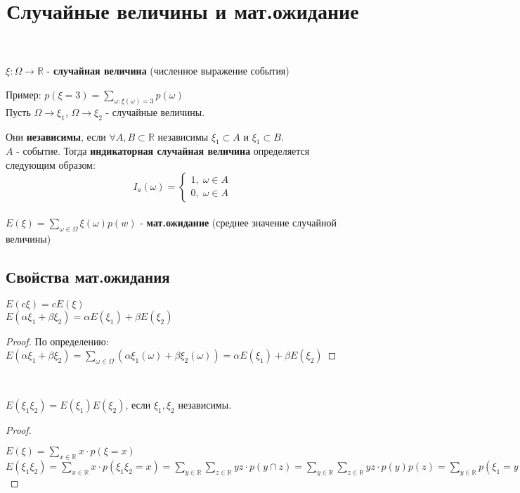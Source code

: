 \documentclass[a4paper,12pt]{article}
\title{Случайные величины и мат.ожидание}
\date{}
\begin{document}
	\maketitle
	\noindent $\xi:  \Omega \rightarrow \mathbb{R}$ - \textbf{случайная величина} (численное выражение события)

	\noindent Пример: $p(\xi=3)=\sum\limits_{\omega: \xi(\omega)=3} p(\omega)$\\

	\noindent Пусть  $\Omega \rightarrow \xi_1$, $\Omega \rightarrow \xi_2$ - случайные величины.

	\noindent Они \textbf{независимы}, если $\forall A, B \subset \mathbb{R}$ независимы $\xi_1 \subset A$ и $\xi_1 \subset B$.\\

	\noindent $A$ - событие. Тогда \textbf{индикаторная случайная величина} определяется следующим образом:
	\begin{equation*}
	I_a(\omega) =
	\begin{cases}
	1, \; \omega\in A\\
	0, \; \omega \in A
	\end{cases}
	\end{equation*}\\

	\noindent $E(\xi)=\sum\limits_{\omega \in \Omega} \xi(\omega)p(w)$ - \textbf{мат.ожидание} (среднее значение случайной величины) \\

	\subsection*{Свойства мат.ожидания}
	$E(c\xi)=cE(\xi)$\\


   	\noindent $E(\alpha\xi_1+\beta\xi_2)=\alpha E(\xi_1)+\beta E(\xi_2)$
	\begin{proof}
	По определению:
	$E(\alpha\xi_1+\beta\xi_2)=\sum\limits_{\omega \in \Omega}(\alpha\xi_1(\omega)+\beta\xi_2(\omega))=\alpha E(\xi_1)+\beta E(\xi_2) $
	\end{proof}
    ~\

    \newpage
	\noindent $E(\xi_1\xi_2)=E(\xi_1)E(\xi_2)$, если $\xi_1, \xi_2$ независимы.
	\begin{proof}
	~\

	\noindent $E(\xi)=\sum\limits_{x \in \mathbb{R}}x\cdot p(\xi=x)$\\
	\noindent $E(\xi_1\xi_2)=\sum\limits_{x \in \mathbb{R}}x\cdot p(\xi_1\xi_2=x)=\sum\limits_{y \in \mathbb{R}}\sum\limits_{z \in \mathbb{R}}y z \cdot p(y \cap z)=\sum\limits_{y \in \mathbb{R}}\sum\limits_{z \in \mathbb{R}}y z \cdot p(y)p(z)=\sum\limits_{y \in \mathbb{R}}p(\xi_1=y)+\sum\limits_{z \in \mathbb{R}}p(\xi_2=z)$
	\end{proof}
\end{document}
